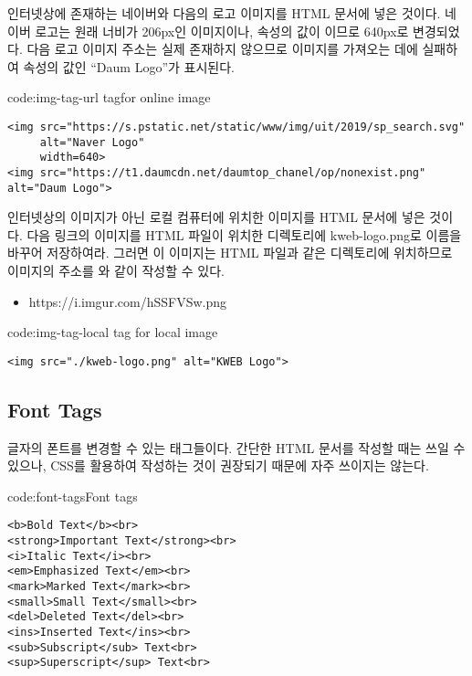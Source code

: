 \은 인터넷상에 존재하는 네이버와 다음의 로고 이미지를 HTML 문서에 넣은 것이다. 네이버 로고는 원래 너비가 206px인 이미지이나,  속성의 값이 이므로 640px로 변경되었다. 다음 로고 이미지 주소는 실제 존재하지 않으므로 이미지를 가져오는 데에 실패하여  속성의 값인 ``Daum Logo''가 표시된다.

\begin{code}{code:img-tag-url}
    { tag\protect\footnotemark for online image}
\begin{verbatim}
<img src="https://s.pstatic.net/static/www/img/uit/2019/sp_search.svg"
     alt="Naver Logo"
     width=640>
<img src="https://t1.daumcdn.net/daumtop_chanel/op/nonexist.png" alt="Daum Logo">
\end{verbatim}
\end{code}

\은 인터넷상의 이미지가 아닌 로컬 컴퓨터에 위치한 이미지를 HTML 문서에 넣은 것이다. 다음 링크의 이미지를 HTML 파일이 위치한 디렉토리에 kweb-logo.png로 이름을 바꾸어 저장하여라. 그러면 이 이미지는 HTML 파일과 같은 디렉토리에 위치하므로 이미지의 주소를 와 같이 작성할 수 있다.

\begin{itemize}
    \item https://i.imgur.com/hSSFVSw.png
\end{itemize}

\begin{code}{code:img-tag-local}{ tag for local image}
\begin{verbatim}
<img src="./kweb-logo.png" alt="KWEB Logo">
\end{verbatim}
\end{code}

\subsection*{Font Tags}
글자의 폰트를 변경할 수 있는 태그들이다. 간단한 HTML 문서를 작성할 때는 쓰일 수 있으나, CSS를 활용하여 작성하는 것이 권장되기 때문에 자주 쓰이지는 않는다.

\begin{code}{code:font-tags}{Font tags}
\begin{verbatim}
<b>Bold Text</b><br>
<strong>Important Text</strong><br>
<i>Italic Text</i><br>
<em>Emphasized Text</em><br>
<mark>Marked Text</mark><br>
<small>Small Text</small><br>
<del>Deleted Text</del><br>
<ins>Inserted Text</ins><br>
<sub>Subscript</sub> Text<br>
<sup>Superscript</sup> Text<br>
\end{verbatim}
\end{code}

